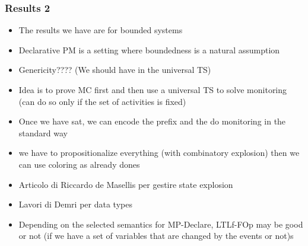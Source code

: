 \documentclass{beamer}
\begin{document}
\begin{frame}
\frametitle{Results 2}

\begin{itemize}
	\item The results we have are for bounded systems
	\item Declarative PM is a setting where boundedness is a natural assumption
	\item Genericity???? (We should have in the universal TS)
	\item Idea is to prove MC first and then use a universal TS to solve monitoring
		(can do so only if the set of activities is fixed)
	\item Once we have sat, we can encode the prefix and the do monitoring in the standard way
	\item we have to propositionalize everything (with combinatory explosion) then we can use coloring as 
	already dones
	\item Articolo di Riccardo de Masellis per gestire state explosion
	\item Lavori di Demri per data types
	\item Depending on the selected semantics for MP-Declare, LTLf-FOp may be 
		good or not (if we have a set of variables that are changed by the events or not)s
\end{itemize}

\end{frame}

\end{document}
